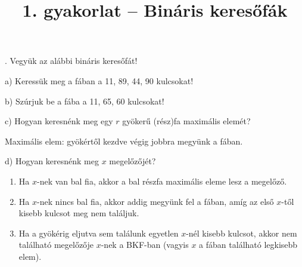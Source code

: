 \documentclass[12pt]{article}
\title{1. gyakorlat -- Bináris keresőfák}
\begin{document}
\maketitle

. Vegyük az alábbi bináris keresőfát!

\begin{figure}[!h]
\centering
\end{figure}

\noindent a) Keressük meg a fában a 11, 89, 44, 90 kulcsokat!

\noindent b) Szúrjuk be a fába a 11, 65, 60 kulcsokat!

\begin{figure}[!h]
\centering
\end{figure}

\noindent c) Hogyan keresnénk meg egy $r$ gyökerű (rész)fa maximális elemét?

Maximális elem: gyökértől kezdve végig jobbra megyünk a fában.

\noindent d) Hogyan keresnénk meg $x$ megelőzőjét?

\begin{enumerate}
\item Ha $x$-nek van bal fia, akkor a bal részfa maximális eleme lesz a megelőző.
\item Ha $x$-nek nincs bal fia, akkor addig megyünk fel a fában, amíg az első $x$-től kisebb kulcsot meg nem találjuk.
\item Ha a gyökérig eljutva sem találunk egyetlen $x$-nél kisebb kulcsot, akkor nem található megelőzője $x$-nek a BKF-ban (vagyis $x$ a fában található legkisebb elem).
\end{enumerate}
\end{document}
